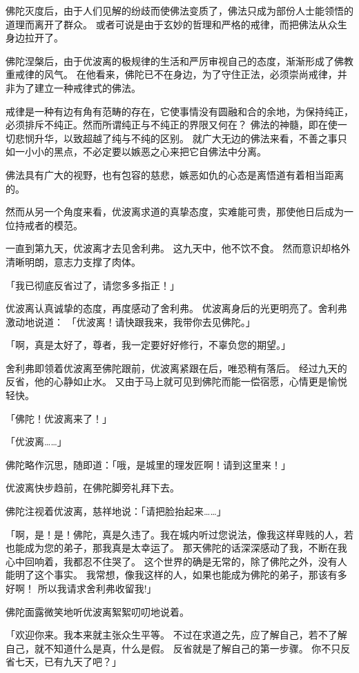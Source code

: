 \documentclass[twoside,openany]{book}
\begin{document}
佛陀灭度后，由于人们见解的纷歧而使佛法变质了，佛法只成为部份人士能领悟的道理而离开了群众。
或者可说是由于玄妙的哲理和严格的戒律，而把佛法从众生身边拉开了。

佛陀涅槃后，由于优波离的极规律的生活和严厉审视自己的态度，渐渐形成了佛教重戒律的风气。
在他看来，佛陀已不在身边，为了守住正法，必须崇尚戒律，并非为了建立一种戒律式的佛法。

戒律是一种有边有角有范畴的存在，它使事情没有圆融和合的余地，为保持纯正，必须排斥不纯正。然而所谓纯正与不纯正的界限又何在？
佛法的神髓，即在使一切悲悯升华，以致超越了纯与不纯的区别。
就广大无边的佛法来看，不善之事只如一小小的黑点，不必定要以嫉恶之心来把它自佛法中分离。

佛法具有广大的视野，也有包容的慈悲，嫉恶如仇的心态是离悟道有着相当距离的。

然而从另一个角度来看，优波离求道的真挚态度，实难能可贵，那使他日后成为一位持戒者的模范。

一直到第九天，优波离才去见舍利弗。
这九天中，他不饮不食。
然而意识却格外清晰明朗，意志力支撑了肉体。

「我已彻底反省过了，请您多多指正！」

优波离认真诚挚的态度，再度感动了舍利弗。
优波离身后的光更明亮了。舍利弗激动地说道：
「优波离！请快跟我来，我带你去见佛陀。」

「啊，真是太好了，尊者，我一定要好好修行，不辜负您的期望。」

舍利弗即领着优波离至佛陀跟前，优波离紧跟在后，唯恐稍有落后。
经过九天的反省，他的心静如止水。
又由于马上就可见到佛陀而能一偿宿愿，心情更是愉悦轻快。

「佛陀！优波离来了！」

「优波离……」

佛陀略作沉思，随即道：「哦，是城里的理发匠啊！请到这里来！」

优波离快步趋前，在佛陀脚旁礼拜下去。

佛陀注视着优波离，慈祥地说：「请把脸抬起来……」

「啊，是！是！佛陀，真是久违了。我在城内听过您说法，像我这样卑贱的人，若也能成为您的弟子，那我真是太幸运了。
那天佛陀的话深深感动了我，不断在我心中回响着，我都忍不住哭了。
这个世界的确是无常的，除了佛陀之外，没有人能明了这个事实。
我常想，像我这样的人，如果也能成为佛陀的弟子，那该有多好啊！
所以我请求舍利弗收留我!」

佛陀面露微笑地听优波离絮絮叨叨地说着。

「欢迎你来。我本来就主张众生平等。
不过在求道之先，应了解自己，若不了解自己，就不知道什么是真，什么是假。
反省就是了解自己的第一步骤。
你不只反省七天，已有九天了吧？」
\end{document}
